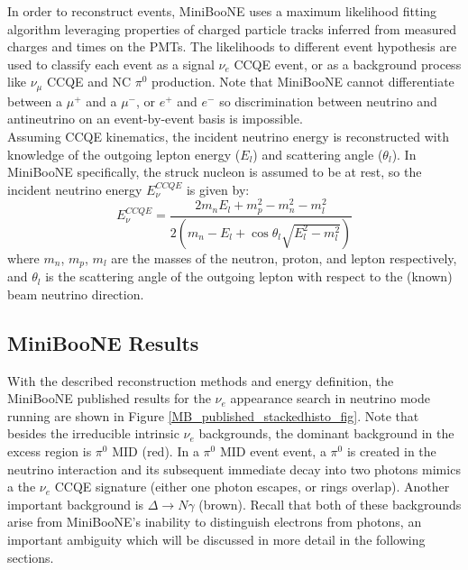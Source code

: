 In order to reconstruct events, MiniBooNE uses a maximum likelihood fitting algorithm leveraging properties of charged particle tracks inferred from measured charges and times on the PMTs. The likelihoods to different event hypothesis are used to classify each event as a signal $\nu_e$ CCQE event, or as a background process like $\nu_\mu$ CCQE and NC $\pi^0$ production. Note that MiniBooNE cannot differentiate between a $\mu^+$ and a $\mu^-$, or $e^+$ and $e^-$ so discrimination between neutrino and antineutrino on an event-by-event basis is impossible.\\

Assuming CCQE kinematics, the incident neutrino energy is reconstructed with knowledge of the outgoing lepton energy ($E_l$) and scattering angle ($\theta_l$). In MiniBooNE specifically, the struck nucleon is assumed to be at rest, so the incident neutrino energy $E_\nu^{CCQE}$ is given by:
\begin{equation}\label{MB_CCQE_formula}
E_\nu^{CCQE} = \frac{2m_nE_l+m_p^2-m_n^2-m_l^2}{2(m_n-E_l+\cos\theta_l\sqrt{E_l^2-m_l^2})}
\end{equation}
where $m_n$, $m_p$, $m_l$ are the masses of the neutron, proton, and lepton respectively, and $\theta_l$ is the scattering angle of the outgoing lepton with respect to the (known) beam neutrino direction.\\

\subsection{MiniBooNE Results}
With the described reconstruction methods and energy definition, the MiniBooNE published results \cite{MBLEEPaper} for the $\nu_e$ appearance search in neutrino mode running are shown in Figure \ref{MB_published_stackedhisto_fig}. Note that besides the irreducible intrinsic $\nu_e$ backgrounds, the dominant background in the excess region is $\pi^0$ MID (red). In a $\pi^0$ MID event event, a $\pi^0$ is created in the neutrino interaction and its subsequent immediate decay into two photons mimics a the $\nu_e$ CCQE signature (either one photon escapes, or rings overlap). Another important background is $\Delta\rightarrow N\gamma$ (brown). Recall that both of these backgrounds arise from MiniBooNE's inability to distinguish electrons from photons, an important ambiguity which will be discussed in more detail in the following sections.\\


